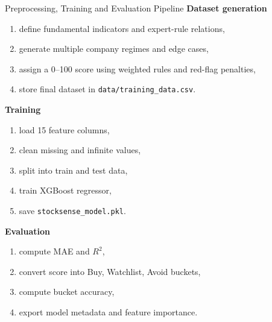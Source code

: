 \documentclass[aspectratio=169]{beamer}
\begin{document}
\begin{frame}[shrink=8]{Preprocessing, Training and Evaluation Pipeline}
\small
\textbf{Dataset generation}
\begin{enumerate}
  \item define fundamental indicators and expert-rule relations,
  \item generate multiple company regimes and edge cases,
  \item assign a 0--100 score using weighted rules and red-flag penalties,
  \item store final dataset in \texttt{data/training\_data.csv}.
\end{enumerate}

\textbf{Training}
\begin{enumerate}
  \item load 15 feature columns,
  \item clean missing and infinite values,
  \item split into train and test data,
  \item train XGBoost regressor,
  \item save \texttt{stocksense\_model.pkl}.
\end{enumerate}

\textbf{Evaluation}
\begin{enumerate}
  \item compute MAE and \(R^2\),
  \item convert score into Buy, Watchlist, Avoid buckets,
  \item compute bucket accuracy,
  \item export model metadata and feature importance.
\end{enumerate}
\end{frame}
\end{document}
